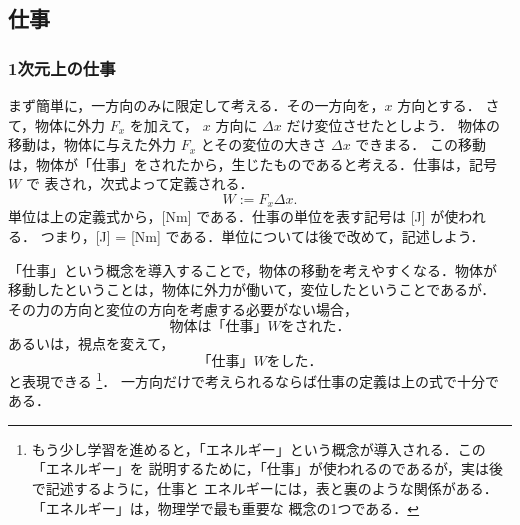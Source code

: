         \subsection{仕事}\label{shou_sigoto}
        \subsubsection{1次元上の仕事}
                まず簡単に，一方向のみに限定して考える．その一方向を，$x$ 方向とする．
                さて，物体に外力 $F_{x}$ を加えて， $x$ 方向に $\Delta x$ だけ変位させたとしよう．
                物体の移動は，物体に与えた外力 $F_{x}$ とその変位の大きさ $\Delta x$ できまる．
                この移動は，物体が「仕事」をされたから，生じたものであると考える．仕事は，記号 $W$ で
                表され，次式よって定義される．
                    \begin{equation*}
                        W  :=  F_{x} \Delta x.
                    \end{equation*}
                単位は上の定義式から，[Nm] である．仕事の単位を表す記号は [J] が使われる．
                つまり，[J] = [Nm] である．単位については後で改めて，記述しよう．

                「仕事」という概念を導入することで，物体の移動を考えやすくなる．物体が
                移動したということは，物体に外力が働いて，変位したということであるが．
                その力の方向と変位の方向を考慮する必要がない場合，
                    \begin{equation*}
                        \mbox{物体は「仕事」} W \mbox{をされた．}
                    \end{equation*}
                あるいは，視点を変えて，
                    \begin{equation*}
                        \mbox{「仕事」} W \mbox{をした．}
                    \end{equation*}
                と表現できる
                    \footnote{
                        もう少し学習を進めると，「エネルギー」という概念が導入される．この「エネルギー」を
                        説明するために，「仕事」が使われるのであるが，実は後で記述するように，仕事と
                        エネルギーには，表と裏のような関係がある．「エネルギー」は，物理学で最も重要な
                        概念の1つである．
                    }．
                一方向だけで考えられるならば仕事の定義は上の式で十分である．

